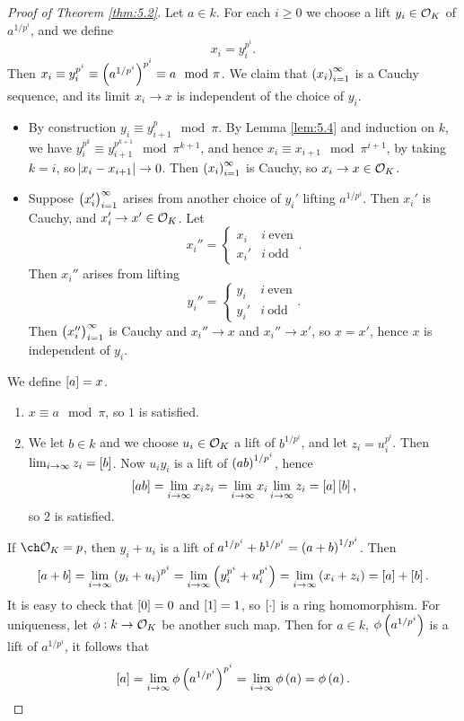 \begin{proof}[Proof of Theorem \ref{thm:5.2}]
Let $ a \in k $. For each $ i \ge 0 $ we choose a lift $ y_i \in \mathcal{O}_K $ of $ a^{1 / p^i} $, and we define
$$ x_i = y_i^{p^i}. $$
Then $ x_i \equiv y_i^{p^i} \equiv \br{a^{1 / p^i}}^{p^i} \equiv a \mod \pi $. We claim that $ \br{x_i}_{i = 1}^\infty $ is a Cauchy sequence, and its limit $ x_i \to x $ is independent of the choice of $ y_i $.
\begin{itemize}
\item By construction $ y_i \equiv y_{i + 1}^p \mod \pi $. By Lemma \ref{lem:5.4} and induction on $ k $, we have $ y_i^{p^k} \equiv y_{i + 1}^{p^{k + 1}} \mod \pi^{k + 1} $, and hence $ x_i \equiv x_{i + 1} \mod \pi^{i + 1} $, by taking $ k = i $, so $ \abs{x_i - x_{i + 1}} \to 0 $. Then $ \br{x_i}_{i = 1}^\infty $ is Cauchy, so $ x_i \to x \in \mathcal{O}_K $.
\item Suppose $ \br{x_i'}_{i = 1}^\infty $ arises from another choice of $ y_i' $ lifting $ a^{1 / p^i} $. Then $ x_i' $ is Cauchy, and $ x_i' \to x' \in \mathcal{O}_K $. Let
$$ x_i'' =
\begin{cases}
x_i & i \ \text{even} \\
x_i' & i \ \text{odd}
\end{cases}.
$$
Then $ x_i'' $ arises from lifting
$$ y_i'' =
\begin{cases}
y_i & i \ \text{even} \\
y_i' & i \ \text{odd}
\end{cases}.
$$
Then $ \br{x_i''}_{i = 1}^\infty $ is Cauchy and $ x_i'' \to x $ and $ x_i'' \to x' $, so $ x = x' $, hence $ x $ is independent of $ y_i $.
\end{itemize}
We define $ \sbr{a} = x $.
\begin{enumerate}
\item $ x \equiv a \mod \pi $, so $ 1 $ is satisfied.
\item We let $ b \in k $ and we choose $ u_i \in \mathcal{O}_K $ a lift of $ b^{1 / p^i} $, and let $ z_i = u_i^{p^i} $. Then $ \lim_{i \to \infty} z_i = \sbr{b} $. Now $ u_iy_i $ is a lift of $ \br{ab}^{1 / p^i} $, hence
$$ \sbr{ab} = \lim_{i \to \infty} x_iz_i = \lim_{i \to \infty} x_i\lim_{i \to \infty} z_i = \sbr{a}\sbr{b}, $$
so $ 2 $ is satisfied.
\end{enumerate}

\pagebreak

If $ \ch \OOO_K = p $, then $ y_i + u_i $ is a lift of $ a^{1 / p^i} + b^{1 / p^i} = \br{a + b}^{1 / p^i} $. Then
$$ \sbr{a + b} = \lim_{i \to \infty} \br{y_i + u_i}^{p^i} = \lim_{i \to \infty} \br{y_i^{p^i} + u_i^{p^i}} = \lim_{i \to \infty} \br{x_i + z_i} = \sbr{a} + \sbr{b}. $$
It is easy to check that $ \sbr{0} = 0 $ and $ \sbr{1} = 1 $, so $ \sbr{\cdot} $ is a ring homomorphism. For uniqueness, let $ \phi : k \to \mathcal{O}_K $ be another such map. Then for $ a \in k $, $ \phi\br{a^{1 / p^i}} $ is a lift of $ a^{1 / p^i} $, it follows that
$$ \sbr{a} = \lim_{i \to \infty} \phi\br{a^{1 / p^i}}^{p^i} = \lim_{i \to \infty} \phi\br{a} = \phi\br{a}. $$
\end{proof}

